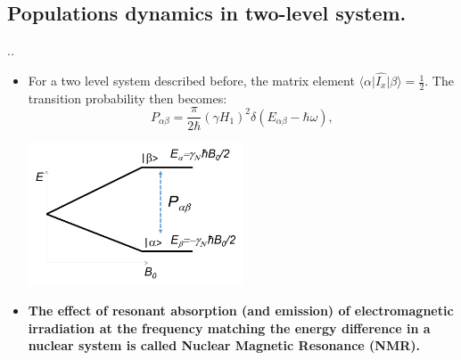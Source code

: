 \documentclass{beamer}
\begin{document}
\subsection{Populations dynamics in two-level system.}
\begin{frame}{\thesection.\thesubsection. \insertsubsection}
	\begin{itemize}[]
		\item 
		For a two level system described before, the matrix element $\langle \alpha \vert \hat{I_x} \vert \beta \rangle = \frac{1}{2}$. The transition probability then becomes:
		\begin{equation}\label{eq:two level transition probability}
		P_{\alpha \beta} = \frac{\pi}{2\hbar} (\gamma H_1)^2 \delta(E_{\alpha \beta}-\hbar \omega),
		\end{equation}
		\begin{minipage}{1.0\textwidth}
			\centering
			\includegraphics[width=0.5\textwidth]{two-level_excite.png}
		\end{minipage}
		\item
		\textbf{The effect of resonant absorption (and emission) of electromagnetic irradiation at the frequency matching the energy difference in a nuclear system is called Nuclear Magnetic Resonance (NMR).} 		    
		
		
	\end{itemize}
	
\end{frame}	
\end{document}
